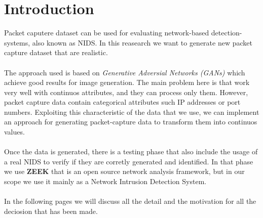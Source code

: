 \chapter*{Introduction}
Packet caputere dataset can be used for evaluating network-based detection-systems, also known as NIDS.
In this reasearch we want to generate new packet capture dataset that are realistic. 
\\\\
The approach used is based on \textit{Generative Adversial Networks (GANs)} which achieve good results for 
image generation. The main problem here is that work very well with continuos attributes, and they can 
process only them. However, packet capture data contain categorical attributes such IP addresses or port numbers.
Exploiting this characteristic of the data that we use, we can implement an approach for generating packet-capture
data to transform them into continuos values.
\\\\
Once the data is generated, there is a testing phase that also include the usage of a real NIDS to 
verify if they are corretly generated and identified. In that phase we use \textbf{ZEEK} that is an open 
source network analysis framework, but in our scope we use it mainly as a Network Intrusion Detection System.
\\\\
In the following pages we will discuss all the detail and the motivation for all the deciosion that has been
made.

